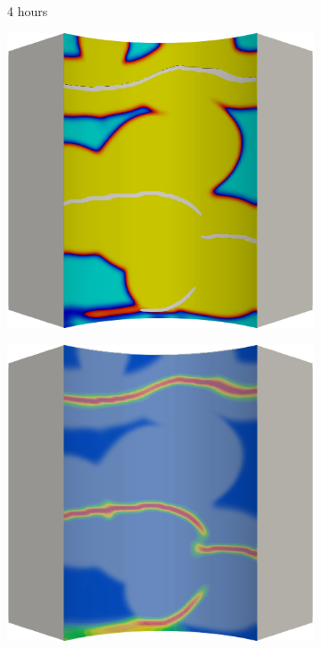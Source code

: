 \begin{figure}[!htbp]
  \begin{subfigure}{0.15\textwidth}
    \centering
    \caption*{4 hours}
  \end{subfigure}
  \begin{subfigure}{0.19\textwidth}
    \centering
    \includegraphics[width=\textwidth]{Chapter5/figures/spallation/c.0030}
  \end{subfigure}
  \hspace{0.06\textwidth}
  \begin{subfigure}{0.19\textwidth}
    \centering
    \includegraphics[width=\textwidth]{Chapter5/figures/spallation/d.0030}

\end{subfigure}
\end{figure}
